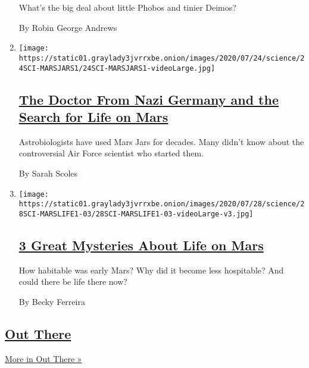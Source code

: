 \begin{enumerate}
  What's the big deal about little Phobos and tinier Deimos?

  By Robin George Andrews
\item
  \texttt{[image: https://static01.graylady3jvrrxbe.onion/images/2020/07/24/science/24SCI-MARSJARS1/24SCI-MARSJARS1-videoLarge.jpg]}

  \hypertarget{the-doctor-from-nazi-germany-and-the-search-for-life-on-mars}{%
  \subsection{\texorpdfstring{\href{/2020/07/24/science/mars-jars-strughold.html}{The
  Doctor From Nazi Germany and the Search for Life on
  Mars}}{The Doctor From Nazi Germany and the Search for Life on Mars}}\label{the-doctor-from-nazi-germany-and-the-search-for-life-on-mars}}

  Astrobiologists have used Mars Jars for decades. Many didn't know
  about the controversial Air Force scientist who started them.

  By Sarah Scoles
\item
  \texttt{[image: https://static01.graylady3jvrrxbe.onion/images/2020/07/28/science/28SCI-MARSLIFE1-03/28SCI-MARSLIFE1-03-videoLarge-v3.jpg]}

  \hypertarget{3-great-mysteries-about-life-on-mars}{%
  \subsection{\texorpdfstring{\href{/2020/07/24/science/mars-life-water.html}{3
  Great Mysteries About Life on
  Mars}}{3 Great Mysteries About Life on Mars}}\label{3-great-mysteries-about-life-on-mars}}

  How habitable was early Mars? Why did it become less hospitable? And
  could there be life there now?

  By Becky Ferreira
\end{enumerate}

\hypertarget{out-there-2}{%
\subsection{\texorpdfstring{\href{/column/out-there}{Out
There}}{Out There}}\label{out-there-2}}

\href{/column/out-there}{More in Out There »}

